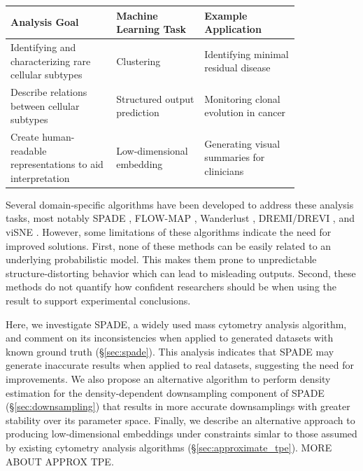 \documentclass{article}
\begin{document}
\begin{table}[H]
\small
\begin{tabular}{|p{0.3\linewidth}|p{0.25\linewidth}|p{0.27\linewidth}|}%
\hline
\textbf{Analysis Goal} & \textbf{Machine Learning Task} & 
\textbf{Example Application}\\ \hline

Identifying and characterizing rare cellular subtypes & Clustering
& Identifying minimal residual disease \\ \hline

 Describe relations between cellular subtypes & Structured output prediction 
&  Monitoring clonal evolution in cancer \\ \hline

 Create human-readable representations to aid interpretation &Low-dimensional embedding
& Generating visual summaries for clinicians \\
\hline
\end{tabular}
\end{table}

Several domain-specific algorithms have been developed to address these analysis tasks, most notably SPADE \cite{}, FLOW-MAP \cite{}, Wanderlust \cite{}, DREMI/DREVI \cite{}, and viSNE \cite{}. 
 However, some limitations of these algorithms indicate the need for improved solutions. 
 First, none of these methods can be easily related to an underlying probabilistic model. 
This makes them prone to unpredictable structure-distorting behavior which can lead to misleading outputs.
Second, these methods do not quantify how confident researchers should be when using the result to support experimental conclusions.

Here, we investigate SPADE, a widely used mass cytometry analysis algorithm,  and comment on its inconsistencies when applied to generated datasets with known ground truth (\S\ref{sec:spade}). 
This analysis indicates that SPADE may generate inaccurate results when applied to real datasets, suggesting the need for improvements.  
We also propose an alternative algorithm to perform density estimation for the density-dependent downsampling component of SPADE  (\S\ref{sec:downsampling}) that results in more accurate downsamplings with greater stability over its parameter space.
 Finally, we describe an alternative approach to producing low-dimensional embeddings under constraints simlar to those assumed by existing cytometry analysis algorithms (\S\ref{sec:approximate_tpe}). 
  MORE ABOUT APPROX TPE. 
\end{document}
